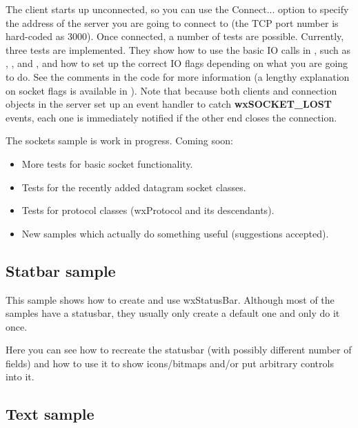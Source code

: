 The client starts up unconnected, so you can use the Connect... option
to specify the address of the server you are going to connect to (the
TCP port number is hard-coded as 3000). Once connected, a number of
tests are possible. Currently, three tests are implemented. They show
how to use the basic IO calls in ,
such as , ,
 and ,
and how to set up the correct IO flags depending on what you are going to
do. See the comments in the code for more information (a lengthy explanation
on socket flags is available in ).
Note that because both clients and connection objects in the server set
up an event handler to catch {\bf wxSOCKET\_LOST} events, each one is
immediately notified if the other end closes the connection.

The sockets sample is work in progress. Coming soon:

\begin{itemize}

\item More tests for basic socket functionality.

\item Tests for the recently added datagram socket classes.

\item Tests for protocol classes (wxProtocol and its descendants).

\item New samples which actually do something useful (suggestions accepted).

\end{itemize}

\subsection{Statbar sample}\label{samplestatbar}

This sample shows how to create and use wxStatusBar. Although most of the
samples have a statusbar, they usually only create a default one and only
do it once.

Here you can see how to recreate the statusbar (with possibly different number
of fields) and how to use it to show icons/bitmaps and/or put arbitrary
controls into it.

\subsection{Text sample}\label{sampletext}

